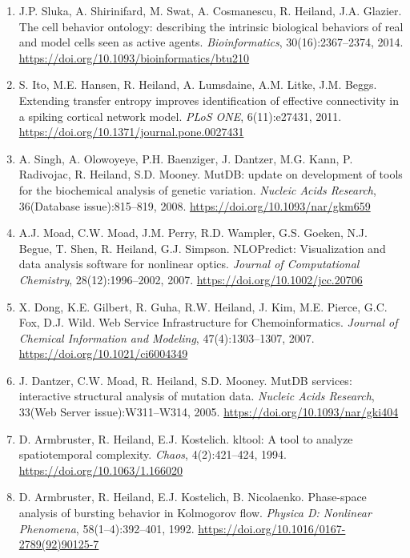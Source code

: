 \documentclass[11pt]{article}
\begin{document}
\begin{enumerate}[leftmargin=*, itemsep=3pt, topsep=4pt]
    \item J.P. Sluka, A. Shirinifard, M. Swat, A. Cosmanescu, R. Heiland, J.A. Glazier. The cell behavior ontology: describing the intrinsic biological behaviors of real and model cells seen as active agents. \textit{Bioinformatics}, 30(16):2367--2374, 2014. \url{https://doi.org/10.1093/bioinformatics/btu210}

    \item S. Ito, M.E. Hansen, R. Heiland, A. Lumsdaine, A.M. Litke, J.M. Beggs. Extending transfer entropy improves identification of effective connectivity in a spiking cortical network model. \textit{PLoS ONE}, 6(11):e27431, 2011. \url{https://doi.org/10.1371/journal.pone.0027431}

    \item A. Singh, A. Olowoyeye, P.H. Baenziger, J. Dantzer, M.G. Kann, P. Radivojac, R. Heiland, S.D. Mooney. MutDB: update on development of tools for the biochemical analysis of genetic variation. \textit{Nucleic Acids Research}, 36(Database issue):815--819, 2008. \url{https://doi.org/10.1093/nar/gkm659}

    \item A.J. Moad, C.W. Moad, J.M. Perry, R.D. Wampler, G.S. Goeken, N.J. Begue, T. Shen, R. Heiland, G.J. Simpson. NLOPredict: Visualization and data analysis software for nonlinear optics. \textit{Journal of Computational Chemistry}, 28(12):1996--2002, 2007. \url{https://doi.org/10.1002/jcc.20706}

    \item X. Dong, K.E. Gilbert, R. Guha, R.W. Heiland, J. Kim, M.E. Pierce, G.C. Fox, D.J. Wild. Web Service Infrastructure for Chemoinformatics. \textit{Journal of Chemical Information and Modeling}, 47(4):1303--1307, 2007. \url{https://doi.org/10.1021/ci6004349}

    \item J. Dantzer, C.W. Moad, R. Heiland, S.D. Mooney. MutDB services: interactive structural analysis of mutation data. \textit{Nucleic Acids Research}, 33(Web Server issue):W311--W314, 2005. \url{https://doi.org/10.1093/nar/gki404}

    \item D. Armbruster, R. Heiland, E.J. Kostelich. kltool: A tool to analyze spatiotemporal complexity. \textit{Chaos}, 4(2):421--424, 1994. \url{https://doi.org/10.1063/1.166020}

    \item D. Armbruster, R. Heiland, E.J. Kostelich, B. Nicolaenko. Phase-space analysis of bursting behavior in Kolmogorov flow. \textit{Physica D: Nonlinear Phenomena}, 58(1--4):392--401, 1992. \url{https://doi.org/10.1016/0167-2789(92)90125-7}
\end{enumerate}
\end{document}
